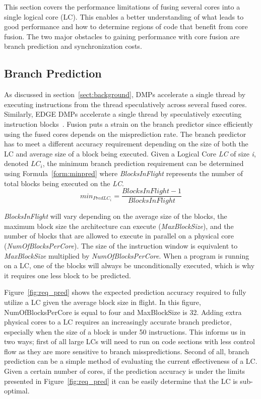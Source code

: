 This section covers the performance limitations of fusing several cores into a single logical core (LC).
This enables a better understanding of what leads to good performance and how to determine regions of code that benefit from core fusion.
The two major obstacles to gaining performance with core fusion are branch prediction and synchronization costs.

\subsection{Branch Prediction}

As discussed in section~\ref{sect:background}, DMPs accelerate a single thread by executing instructions from the thread speculatively across several fused cores. 
Similarly, EDGE DMPs accelerate a single thread by speculatively executing instruction blocks~\cite{pricopi2012bahurupi, putnam2010e2}.
Fusion puts a strain on the branch predictor since efficiently using the fused cores depends on the misprediction rate.
The branch predictor has to meet a different accuracy requirement depending on the size of both the LC and average size of a block being executed.
Given a Logical Core \textit{LC} of size \textit{i}, denoted \textit{$LC_i$}, the minimum branch prediction requirement can be determined using Formula~\ref{form:minpred} where \textit{BlocksInFlight} represents the number of total blocks being executed on the \textit{LC}.
\begin{equation}\label{form:minpred}
min_{PredLC_i }= \frac{BlocksInFlight - 1}{BlocksInFlight}
\end{equation}
\vspace{5mm}

\textit{BlocksInFlight} will vary depending on the average size of the blocks, the maximum block size the architecture can execute (\textit{MaxBlockSize}), and the number of blocks 
that are allowed to execute in parallel on a physical core (\textit{NumOfBlocksPerCore}). 
The size of the instruction window is equivalent to \textit{MaxBlockSize} multiplied by \textit{NumOfBlocksPerCore}.
When a program is running on a LC, one of the blocks will always be unconditionally executed, which is why it requires one less block to be predicted.

Figure~\ref{fig:req_pred} shows the expected prediction accuracy required to fully utilize a LC given the average block size in flight.
In this figure, NumOfBlocksPerCore is equal to four and MaxBlockSize is 32.
Adding extra physical cores to a LC requires an increasingly accurate branch predictor, especially when the size of a block is under 50 instructions.
This informs us in two ways; first of all large LCs will need to run on code sections with less control flow as they are more sensitive to branch misspredictions.
Second of all, branch prediction can be a simple method of evaluating the current effectiveness of a LC.
Given a certain number of cores, if the prediction accuracy is under the limits presented in Figure~\ref{fig:req_pred} it can be easily determine that the LC is sub-optimal.

